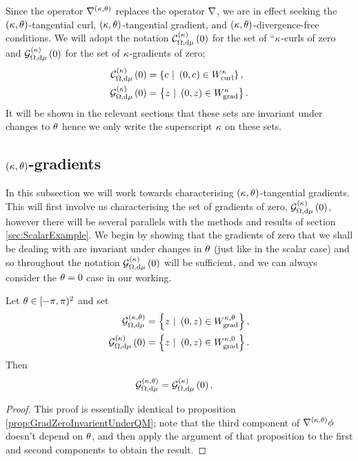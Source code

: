 Since the operator $\nabla^{\left( \kappa, \theta \right)}$ replaces the operator $\nabla$, we are in effect seeking the $\left( \kappa, \theta \right)$-tangential curl, $\left( \kappa, \theta \right)$-tangential gradient, and $\left( \kappa, \theta \right)$-divergence-free conditions. 
We will adopt the notation $\mathcal{C}_{ \Omega, \mathrm{d}\mu}^{(\kappa)}\left( 0 \right)$ for the set of ``$\kappa$-curls of zero and $\mathcal{G}_{ \Omega, \mathrm{d}\mu}^{(\kappa)}\left( 0 \right)$ for the set of $\kappa$-gradients of zero;
\begin{align*}
	\kcurlZero{\ddom}{\ddmes} &= \clbracs{ c \ \vert \ \bracs{0,c}\in W^{\wavenumber}_{\mathrm{curl}}}, \\
	\kgradZero{\ddom}{\ddmes} &= \clbracs{ z \ \vert \ \bracs{0,z}\in W^{\wavenumber}_{\mathrm{grad}}}.
\end{align*}
It will be shown in the relevant sections that these sets are invariant under changes to $\theta$ hence we only write the superscript $\kappa$ on these sets. \newline

\subsection{$\left( \kappa, \theta \right)$-gradients} \label{sec:ktGradients}
In this subsection we will work towards characterising $\left( \kappa,\theta \right)$-tangential gradients.
This will first involve us characterising the set of gradients of zero, $\mathcal{G}_{ \Omega, \mathrm{d}\mu}^{(\kappa)}\left( 0 \right)$, however there will be several parallels with the methods and results of section \ref{sec:ScalarExample}. 
We begin by showing that the gradients of zero that we shall be dealing with are invariant under changes in $\theta$ (just like in the scalar case) and so throughout the notation $\mathcal{G}_{ \Omega, \mathrm{d}\mu}^{(\kappa)}\left( 0 \right)$ will be sufficient, and we can always consider the $\theta=0$ case in our working.
\begin{prop} \label{prop:kGradZeroInvarientUnderQM}
	Let $\theta\in[-\pi,\pi)^2$ and set 
	\begin{align*}
		\mathcal{G}^{\kt}_{\ddom, \mathrm{d}\ddmes} &= \clbracs{ z \ \vert \ \bracs{0,z}\in W^{\wavenumber, \qm}_{\mathrm{grad}}}, \\
		\kgradZero{\ddom}{\ddmes} &= \clbracs{ z \ \vert \ \bracs{0,z}\in W^{\wavenumber, 0}_{\mathrm{grad}}}.
	\end{align*}
	Then
	\begin{align*}
		\mathcal{G}^{\left( \kappa, \theta \right)}_{\Omega, \mathrm{d}\mu} &= \mathcal{G}_{ \Omega, \mathrm{d}\mu}^{(\kappa)}\left( 0 \right).
	\end{align*}
\end{prop}
\begin{proof}
	This proof is essentially identical to proposition \ref{prop:GradZeroInvarientUnderQM}; note that the third component of $\nabla^{\left( \kappa, \theta \right)}\phi$ doesn't depend on $\theta$, and then apply the argument of that proposition to the first and second components to obtain the result.
\end{proof}

